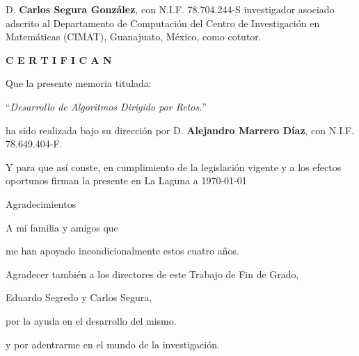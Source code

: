\documentclass[spanish,a4paper,14pt,oneside]{extreport}
\begin{document}
\bigskip
D. {\bf Carlos Segura González}, con N.I.F. 78.704.244-S
investigador 
asociado adscrito al Departamento de Computación del Centro de Investigación en
Matemáticas (CIMAT), Guanajuato, México, como cotutor.

\bigskip
\bigskip
{\bf C E R T I F I C A N}

\bigskip
\bigskip
\bigskip
Que la presente memoria titulada:

\bigskip
``{\it Desarrollo de Algoritmos Dirigido por Retos.}''

\bigskip
\bigskip
\bigskip

\noindent ha sido realizada bajo su dirección por D. {\bf Alejandro Marrero Díaz},
con N.I.F. 78.649.404-F.

\bigskip
\bigskip

Y para que así conste, en cumplimiento de la legislación vigente y a los efectos
oportunos firman la presente en La Laguna a \today

\newpage
\thispagestyle{empty}

{ \flushright

\begin{LARGE}
Agradecimientos
\end{LARGE}

\hspace{3mm}

\begin{large}


\hspace{3mm}
A mi familia y amigos que

\hspace{3mm}
me han apoyado incondicionalmente estos cuatro años.

\bigskip

\hspace{3mm}
Agradecer también a los directores de este Trabajo de Fin de Grado,

\hspace{3mm}
Eduardo Segredo y Carlos Segura,

\hspace{3mm}
por la ayuda en el desarrollo del mismo.

\hspace{3mm}
y por adentrarme en el mundo de la investigación.

\end{large}

}

\newpage
\end{document}
